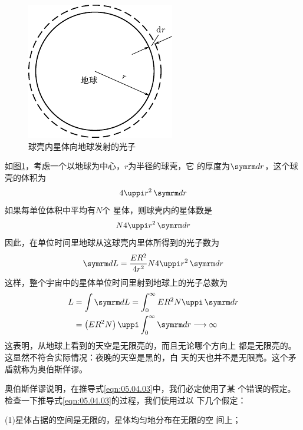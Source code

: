 \begin{figure}
    \centering
    \vspace{-2.5em}
    \includegraphics{figure/fig05.03}
    \caption{球壳内星体向地球发射的光子}
    \label{fig:05.03}
\end{figure}
如图\ref{fig:05.03}，考虑一个以地球为中心，$ r $为半径的球壳，它
的厚度为$ \dif r $，这个球壳的体积为
\begin{equation*}
    4 \uppi r ^ { 2 } \dif r
\end{equation*}%
如果每单位体积中平均有$ N $个
星体，则球壳内的星体数是
\begin{equation}\label{eqn:05.04.02}
    N  4  \uppi r ^ { 2 } \dif r
\end{equation}
因此，在单位时间里地球从这球壳内里体所得到的光子数为
\begin{equation*}
    \dif L = \frac { E R ^ { 2 } } { 4 r ^ { 2 } } N 4 \uppi r ^ { 2 } \dif r
\end{equation*}
这样，整个宇宙中的星体单位时间里射到地球上的光子总数为
\begin{equation}\label{eqn:05.04.03}
    \begin{aligned}
    L &= \int \dif L = \int _ 0 ^ { \infty } { E R ^ { 2 } N \uppi \dif r } \\
      &= \left( E R ^ { 2 } N \right) \uppi \int _ 0 ^ { \infty } \dif r \longrightarrow \infty
    \end{aligned}
\end{equation}
这表明，从地球上看到的天空是无限亮的，而且无论哪个方向上
都是无限亮的。这显然不符合实际情况：夜晚的天空是黑的，白
天的天也并不是无限亮。这个矛盾就称为奥伯斯佯谬。

奥伯斯佯谬说明，在推导式\eqref{eqn:05.04.03}中，我们必定使用了某
个错误的假定。检查一下推导式\eqref{eqn:05.04.03}的过程，我们使用过以
下几个假定：

(1)星体占据的空间是无限的，星体均匀地分布在无限的空
间上；

